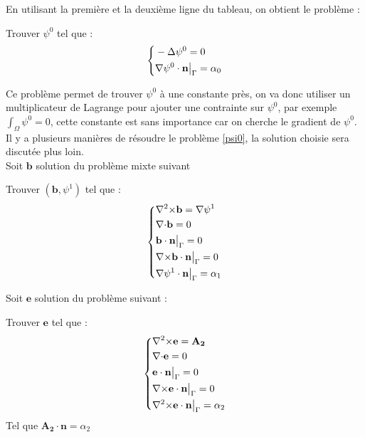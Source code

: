 En utilisant la première et la deuxième ligne du tableau, on obtient le problème :
\begin{pb}\label{psi0}
Trouver $\psi^0$ tel que :
\begin{equation*}
\left\{\begin{aligned}
&-{\Delta}\psi^0 = 0\\
&{\nabla}\psi^0\cdot \mathbf{n}{\big\rvert_{\Gamma}}=\alpha_0
\end{aligned}\right.
\end{equation*}\end{pb}
Ce problème permet de trouver $\psi^0$ à une constante près, on va donc utiliser un multiplicateur de Lagrange pour ajouter une contrainte sur $\psi^0$, par exemple $\int_\Omega \psi^0 = 0$, cette constante est sans importance car on cherche le gradient de $\psi^0$.\\
Il y a plusieurs manières de résoudre le problème \ref{psi0}, la solution choisie sera discutée plus loin.\\

Soit $\mathbf{b}$ solution du problème mixte suivant
\begin{pb}\label{curlb}
Trouver $(\mathbf{b},\psi^1)$ tel que :
\begin{equation*}
\left\{\begin{aligned}
&{\nabla^2\times} \mathbf{b} = {\nabla}\psi^1\\
&{\nabla\cdot} \mathbf{b} = 0\\
&\mathbf{b}\cdot \mathbf{n}{\big\rvert_{\Gamma}} = 0\\
&{\nabla\times} \mathbf{b}\cdot \mathbf{n}{\big\rvert_{\Gamma}} = 0\\
&{\nabla}\psi^1\cdot \mathbf{n}{\big\rvert_{\Gamma}} = \alpha_1
\end{aligned}\right.
\end{equation*}\end{pb}

Soit $\mathbf{e}$ solution du problème suivant :
\begin{pb}
  Trouver $\mathbf{e}$ tel que :
  \begin{equation*}
    \left\{\begin{aligned}
    &{\nabla^2\times}\mathbf{e} = \mathbf{A_2}\\
    &{\nabla\cdot} \mathbf{e} = 0\\
    &\mathbf{e}\cdot\mathbf{n}{\big\rvert_{\Gamma}} = 0\\
    &{\nabla\times}\mathbf{e}\cdot\mathbf{n}{\big\rvert_{\Gamma}} = 0\\
    &{\nabla^2\times}\mathbf{e}\cdot\mathbf{n}{\big\rvert_{\Gamma}} = \alpha_2
    \end{aligned}\right.
  \end{equation*}
  Tel que $\mathbf{A_2}\cdot\mathbf{n} = \alpha_2$
\end{pb}

